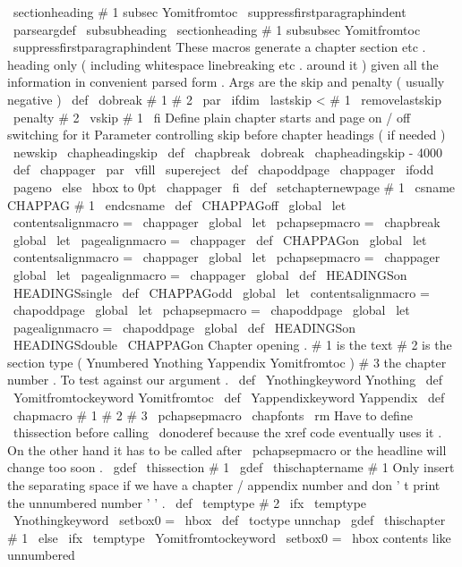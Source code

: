 {{
\
sectionheading
{
#
1
}
{
subsec
}
{
Yomitfromtoc
}
{
}
\
suppressfirstparagraphindent
}
\
parseargdef
\
subsubheading
{
\
sectionheading
{
#
1
}
{
subsubsec
}
{
Yomitfromtoc
}
{
}
\
suppressfirstparagraphindent
}
%
These
macros
generate
a
chapter
section
etc
.
heading
only
%
(
including
whitespace
linebreaking
etc
.
around
it
)
%
given
all
the
information
in
convenient
parsed
form
.
%
%
%
Args
are
the
skip
and
penalty
(
usually
negative
)
\
def
\
dobreak
#
1
#
2
{
\
par
\
ifdim
\
lastskip
<
#
1
\
removelastskip
\
penalty
#
2
\
vskip
#
1
\
fi
}
%
%
%
Define
plain
chapter
starts
and
page
on
/
off
switching
for
it
%
Parameter
controlling
skip
before
chapter
headings
(
if
needed
)
\
newskip
\
chapheadingskip
\
def
\
chapbreak
{
\
dobreak
\
chapheadingskip
{
-
4000
}
}
\
def
\
chappager
{
\
par
\
vfill
\
supereject
}
\
def
\
chapoddpage
{
\
chappager
\
ifodd
\
pageno
\
else
\
hbox
to
0pt
{
}
\
chappager
\
fi
}
\
def
\
setchapternewpage
#
1
{
\
csname
CHAPPAG
#
1
\
endcsname
}
\
def
\
CHAPPAGoff
{
%
\
global
\
let
\
contentsalignmacro
=
\
chappager
\
global
\
let
\
pchapsepmacro
=
\
chapbreak
\
global
\
let
\
pagealignmacro
=
\
chappager
}
\
def
\
CHAPPAGon
{
%
\
global
\
let
\
contentsalignmacro
=
\
chappager
\
global
\
let
\
pchapsepmacro
=
\
chappager
\
global
\
let
\
pagealignmacro
=
\
chappager
\
global
\
def
\
HEADINGSon
{
\
HEADINGSsingle
}
}
\
def
\
CHAPPAGodd
{
%
\
global
\
let
\
contentsalignmacro
=
\
chapoddpage
\
global
\
let
\
pchapsepmacro
=
\
chapoddpage
\
global
\
let
\
pagealignmacro
=
\
chapoddpage
\
global
\
def
\
HEADINGSon
{
\
HEADINGSdouble
}
}
\
CHAPPAGon
%
Chapter
opening
.
%
%
#
1
is
the
text
#
2
is
the
section
type
(
Ynumbered
Ynothing
%
Yappendix
Yomitfromtoc
)
#
3
the
chapter
number
.
%
%
To
test
against
our
argument
.
\
def
\
Ynothingkeyword
{
Ynothing
}
\
def
\
Yomitfromtockeyword
{
Yomitfromtoc
}
\
def
\
Yappendixkeyword
{
Yappendix
}
%
\
def
\
chapmacro
#
1
#
2
#
3
{
%
\
pchapsepmacro
{
%
\
chapfonts
\
rm
%
%
Have
to
define
\
thissection
before
calling
\
donoderef
because
the
%
xref
code
eventually
uses
it
.
On
the
other
hand
it
has
to
be
called
%
after
\
pchapsepmacro
or
the
headline
will
change
too
soon
.
\
gdef
\
thissection
{
#
1
}
%
\
gdef
\
thischaptername
{
#
1
}
%
%
%
Only
insert
the
separating
space
if
we
have
a
chapter
/
appendix
%
number
and
don
'
t
print
the
unnumbered
number
'
'
.
\
def
\
temptype
{
#
2
}
%
\
ifx
\
temptype
\
Ynothingkeyword
\
setbox0
=
\
hbox
{
}
%
\
def
\
toctype
{
unnchap
}
%
\
gdef
\
thischapter
{
#
1
}
%
\
else
\
ifx
\
temptype
\
Yomitfromtockeyword
\
setbox0
=
\
hbox
{
}
%
contents
like
unnumbered
}}}
